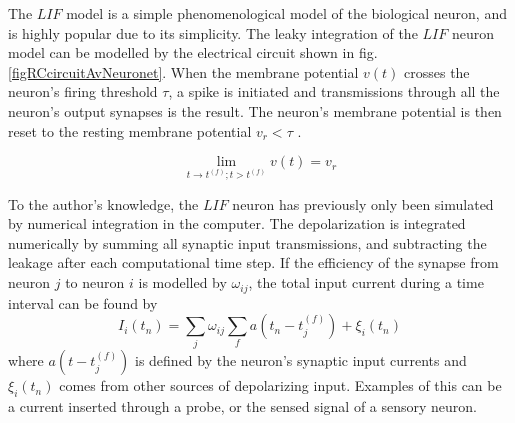 	The $LIF$ model is a simple phenomenological model of the biological neuron, and is highly popular due to its simplicity.
	The leaky integration of the $LIF$ neuron model can be modelled by the electrical circuit shown in fig. \ref{figRCcircuitAvNeuronet}.
	When the membrane potential $v(t)$ crosses the neuron's firing threshold $\tau$, a spike is initiated and transmissions through all the neuron's output synapses is the result.
	The neuron's membrane potential is then reset to the resting membrane potential $v_r<\tau$ \cite{gerstnerKistler2002}. %

\begin{equation}
	\lim\limits_{t\to t^{(f)}; t>t^{(f)}} v(t) = v_r
\end{equation}

	To the author's knowledge, the $LIF$ neuron has previously only been simulated by numerical integration in the computer.
	The depolarization is integrated numerically by summing all synaptic input transmissions, and subtracting the leakage after each computational time step.
	If the efficiency of the synapse from neuron $j$ to neuron $i$ is modelled by $\omega_{ij}$, the total input current during a time interval can be found by 
\begin{equation}
	I_i(t_n) = \sum_j \omega_{ij} \sum_f a(t_n - t_j^{(f)}) + \xi_i(t_n)
\end{equation}
	where $a(t- t_j^{(f)})$ is defined by the neuron's synaptic input currents and $\xi_i(t_n)$ comes from other sources of depolarizing input\cite{florian03}.
	Examples of this can be a current inserted through a probe, or the sensed signal of a sensory neuron.

